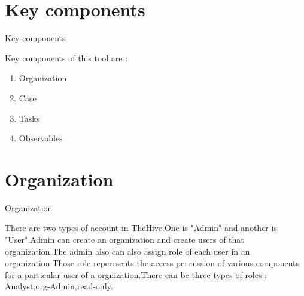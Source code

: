 \section{Key components}
\begin{frame}{Key components}
\begin{justify}

    Key components of this tool are :
    \begin{enumerate}
    \item Organization
    \item Case
    \item Tasks
    \item Observables
    \end{enumerate}

           
\end{justify}

\end{frame}


\section{Organization}
\begin{frame}{Organization}
\begin{justify}

There are two types of account in TheHive.One is "Admin" and another is "User".Admin can create an organization and create users of that organization.The admin also can also assign role of each user in an organization.Those role reperesents the access permission of various components for a particular user of a orgnization.There can be three types of roles : Analyst,org-Admin,read-only.

           
\end{justify}

\end{frame}


